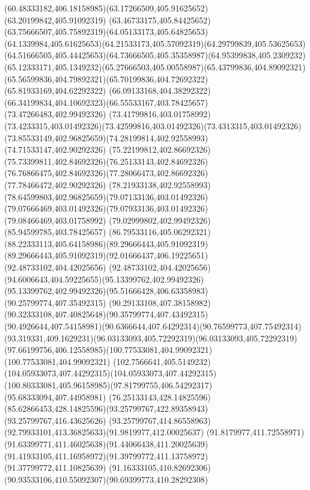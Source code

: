 {{		\curveto(60.48333182,406.18158985)(63.17266509,405.91625652)(63.20199842,405.91092319)
		\curveto(63.46733175,405.84425652)(63.75666507,405.75892319)(64.05133173,405.64825653)
		\curveto(64.1339984,405.61625653)(64.21533173,405.57092319)(64.29799839,405.53625653)
		\curveto(64.51666505,405.44425653)(64.73666505,405.35358987)(64.95399838,405.2309232)
		\curveto(65.12333171,405.1349232)(65.27666503,405.00558987)(65.43799836,404.89092321)
		\curveto(65.56599836,404.79892321)(65.70199836,404.72692322)(65.81933169,404.62292322)
		\curveto(66.09133168,404.38292322)(66.34199834,404.10692323)(66.55533167,403.78425657)
		\lineto(73.47266483,402.99492326)
		\lineto(73.41799816,403.01758992)
		\curveto(73.4233315,403.01492326)(73.42599816,403.01492326)(73.4313315,403.01492326)
		\curveto(73.85533149,402.96825659)(74.28199814,402.92558993)(74.71533147,402.90292326)
		\curveto(75.22199812,402.86692326)(75.73399811,402.84692326)(76.25133143,402.84692326)
		\curveto(76.76866475,402.84692326)(77.28066473,402.86692326)(77.78466472,402.90292326)
		\curveto(78.21933138,402.92558993)(78.64599803,402.96825659)(79.07133136,403.01492326)
		\curveto(79.07666469,403.01492326)(79.07933136,403.01492326)(79.08466469,403.01758992)
		\lineto(79.02999802,402.99492326)
		\lineto(85.94599785,403.78425657)
		\curveto(86.79533116,405.06292321)(88.22333113,405.64158986)(89.29666443,405.91092319)
		\curveto(89.29666443,405.91092319)(92.01666437,406.19225651)(92.48733102,404.42025656)
		\curveto(92.48733102,404.42025656)(94.6006643,404.59225655)(95.13399762,402.99492326)
		\curveto(95.13399762,402.99492326)(95.51666428,406.63358983)(90.25799774,407.35492315)
		\curveto(90.29133108,407.38158982)(90.32333108,407.40825648)(90.35799774,407.43492315)
		\curveto(90.4926644,407.54158981)(90.6366644,407.64292314)(90.76599773,407.75492314)
		\curveto(93.319331,409.1629231)(96.03133093,405.72292319)(96.03133093,405.72292319)
		\curveto(97.66199756,406.12558985)(100.77533081,404.99092321)(100.77533081,404.99092321)
		\curveto(102.7566641,405.5149232)(104.05933073,407.44292315)(104.05933073,407.44292315)
		\curveto(100.80333081,405.96158985)(97.81799755,406.54292317)(95.68333094,407.44958981)
		\moveto(76.25133143,428.14825596)
		\curveto(85.62866453,428.14825596)(93.25799767,422.89358943)(93.25799767,416.43625626)
		\curveto(93.25799767,414.86558963)(92.79933101,413.36825633)(91.9819977,412.00025637)
		\curveto(91.8179977,411.72558971)(91.63399771,411.46025638)(91.44066438,411.20025639)
		\curveto(91.41933105,411.16958972)(91.39799772,411.13758972)(91.37799772,411.10825639)
		\curveto(91.16333105,410.82692306)(90.93533106,410.55092307)(90.69399773,410.28292308)
}}
